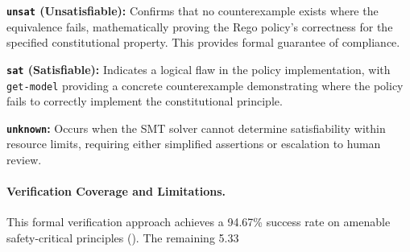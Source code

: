 \documentclass[manuscript,screen,9pt]{acmart}
\begin{document}
\noindent\textbf{\texttt{unsat} (Unsatisfiable):} Confirms that no counterexample exists where the equivalence fails, mathematically proving the Rego policy's correctness for the specified constitutional property. This provides formal guarantee of compliance.

\noindent\textbf{\texttt{sat} (Satisfiable):} Indicates a logical flaw in the policy implementation, with \texttt{get-model} providing a concrete counterexample demonstrating where the policy fails to correctly implement the constitutional principle.

\noindent\textbf{\texttt{unknown}:} Occurs when the SMT solver cannot determine satisfiability within resource limits, requiring either simplified assertions or escalation to human review.

\paragraph{Verification Coverage and Limitations.} This formal verification approach achieves a 94.67\% success rate on amenable safety-critical principles (). The remaining 5.33%

\end{document}
